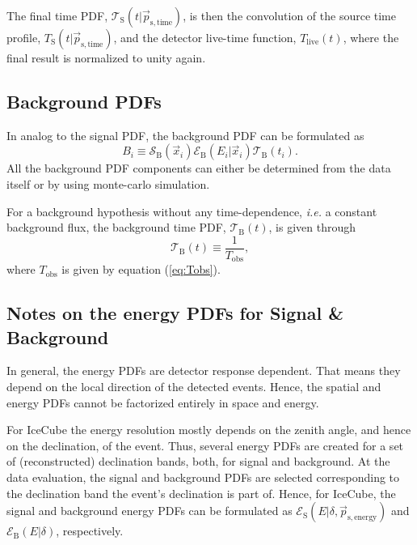 \documentclass{article}
\begin{document}
The final time PDF, $\mathcal{T}_{\mathrm{S}}(t|\vec{p}_{\mathrm{s},\mathrm{time}})$,
is then the convolution of the source time profile,
$T_{\mathrm{S}}(t|\vec{p}_{\mathrm{s},\mathrm{time}})$, and the detector live-time function,
$T_{\mathrm{live}}(t)$, where the final result is normalized to unity again.

\subsection{Background PDFs}

In analog to the signal PDF, the background PDF can be formulated as
\begin{equation}
 B_i \equiv \mathcal{S}_{\mathrm{B}}(\vec{x}_i) \mathcal{E}_{\mathrm{B}}(E_i|\vec{x}_i) \mathcal{T}_{\mathrm{B}}(t_i).
 \label{eq:Bi}
\end{equation}
All the background PDF components can either be determined from the data itself
or by using monte-carlo simulation.

For a background hypothesis without any time-dependence, \emph{i.e.} a constant
background flux, the background time PDF,
$\mathcal{T}_{\mathrm{B}}(t)$, is given through
\begin{equation}
 \mathcal{T}_{\mathrm{B}}(t) \equiv \frac{1}{T_{\mathrm{obs}}},
\end{equation}
where $T_{\mathrm{obs}}$ is given by equation (\ref{eq:Tobs}).


\subsection{Notes on the energy PDFs for Signal \& Background}

In general, the energy PDFs are detector response dependent. That means they
depend on the local direction of the detected events. Hence, the spatial and
energy PDFs cannot be factorized entirely in space and energy.

For IceCube the energy resolution mostly depends on the zenith angle, and hence
on the declination, of the event. Thus, several energy PDFs are created for a
set of (reconstructed) declination bands, both, for signal and background. At
the data evaluation, the signal and background PDFs are selected corresponding
to the declination band the event's declination is part of. Hence, for IceCube,
the signal and background energy PDFs can be formulated as
$\mathcal{E}_{\mathrm{S}}(E|\delta,\vec{p}_{\mathrm{s,energy}})$ and
$\mathcal{E}_{\mathrm{B}}(E|\delta)$, respectively.
\end{document}
